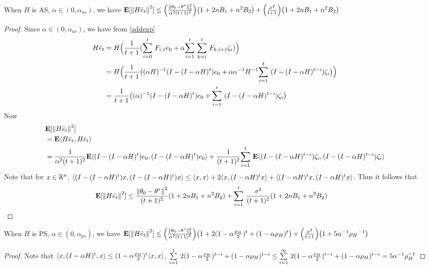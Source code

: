 \begin{theorem}
When $H$ is AS, $\alpha \in (0,\alpha_{as})$, we have
$\E[\norm{H\eb_t}^2]\leq \Big(\frac{\norm{\theta_0-\ts}^2_2}{\alpha^2(t+1)^2}\Big)\big(1+2nB_1+n^2B_2\big)+\Big(\frac{\sigma^2}{t+1}\Big)\big(1+2nB_1+n^2B_2\big)$
\end{theorem}
\begin{proof}
Since $\alpha\in (0,\alpha_{as})$, we have from \eqref{addexp}
\begin{align*}
H\eb_t&=H\Big(\frac{1}{t+1}(\ous{\sum}{i=0}{t} F_{i,1} e_0+ \alpha\ous{\sum}{i=1}{t} \ous{\sum}{k=i}{t} F_{k,i+1}  \zeta_i )\Big)\\
&=H\Big(\frac{1}{t+1}\big((\alpha H)^{-1}(I-(I-\alpha H)^t)e_0+ \alpha \alpha^{-1}H^{-1}\ous{\sum}{i=1}{t}(I-(I-\alpha H)^{t-i}) \zeta_i\big)\Big)\\
&=\frac{1}{t+1}\big((\alpha)^{-1}(I-(I-\alpha H)^t)e_0+ \ous{\sum}{i=1}{t}(I-(I-\alpha H)^{t-i}) \zeta_i\big)
\end{align*}
Now
\begin{align*}
&\E[\norm{H\eb_t}^2]\\
&=\E\ip{H\eb_t,H\eb_t}\\
&=\frac{1}{\alpha^2(t+1)^2}\E\ip{(I-(I-\alpha H)^t)e_0,(I-(I-\alpha H)^t)e_0}+\frac{1}{(t+1)^2}\ous{\sum}{i=1}{t}\E\ip{(I-(I-\alpha H)^{t-i}) \zeta_i,(I-(I-\alpha H)^{t-i}) \zeta_i}
\end{align*}
Note that for $x\in \R^n$, $\ip{(I-(I-\alpha H)^t)x,(I-(I-\alpha H)^t)x}\leq \ip{x,x}+2\ip{x,(I-\alpha H)^tx}+\ip{(I-\alpha H)^t x,(I-\alpha H)^t x}$. Thus it follows that
\begin{align*}
&\E[\norm{H\eb_t}^2]\leq \frac{\norm{\theta_0-\ts}^2}{(t+1)^2} (1+2nB_1+n^2B_2)+\ous{\sum}{i=1}{t}\frac{\sigma^2}{(t+1)^2}(1+2nB_1+n^2B_2)
\end{align*}
\end{proof}


\begin{theorem}
When $H$ is PS, $\alpha \in (0,\alpha_{ps})$, we have
$\E[\norm{H\eb_t}^2]\leq \Big(\frac{\norm{\theta_0-\ts}^2_2}{\alpha^2(t+1)^2}\Big)\big(1+2(1-\alpha\frac{\rho_H}{2})^t+(1-\alpha\rho_H)^t\big)+\Big(\frac{\sigma^2}{t+1}\Big)\big(1+5\alpha^{-1}{\rho_H}^{-1}\big)$
\end{theorem}
\begin{proof}
Note that $\ip{x,(I-\alpha H)^t,x}\leq (1-\alpha\frac{\rho_H}{2})^t \ip{x,x}$, $\ous{\sum}{i=1}{t} 2 (1-\alpha \frac{\rho_H}{2})^{t-i}+(1-\alpha {\rho_H})^{t-i}\leq \ous{\sum}{i=1}{\infty} 2 (1-\alpha \frac{\rho_H}{2})^{t-i}+(1-\alpha {\rho_H})^{t-i}=5\alpha^{-1}\rho_H^{-1}$
\end{proof}

